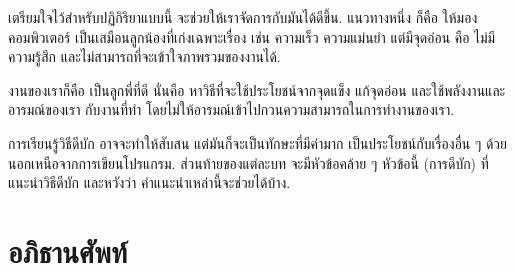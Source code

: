เตรียมใจไว้สำหรับปฏิกิริยาแบบนี้ จะช่วยให้เราจัดการกับมันได้ดีขึ้น.
แนวทางหนึ่ง ก็คือ ให้มองคอมพิวเตอร์ เป็นเสมือนลูกน้องที่เก่งเฉพาะเรื่อง เช่น ความเร็ว ความแม่นยำ
แต่มีจุดอ่อน คือ ไม่มีความรู้สึก และไม่สามารถที่จะเข้าใจภาพรวมของงานได้.

งานของเราก็คือ เป็นลูกพี่ที่ดี
นั่นคือ หาวิธีที่จะใช้ประโยชน์จากจุดแข็ง
แก้จุดอ่อน 
และใช้พลังงานและอารมณ์ของเรา กับงานที่ทำ
โดยไม่ให้อารมณ์เข้าไปกวนความสามารถในการทำงานของเรา.

การเรียนรู้วิธีดีบัก อาจจะทำให้สับสน แต่มันก็จะเป็นทักษะที่มีค่ามาก เป็นประโยชน์กับเรื่องอื่น ๆ ด้วย นอกเหนือจากการเขียนโปรแกรม.
%
ส่วนท้ายของแต่ละบท จะมีหัวข้อคล้าย ๆ หัวข้อนี้ (การดีบัก) ที่แนะนำวิธีดีบัก และหวังว่า คำแนะนำเหล่านี้จะช่วยได้บ้าง.

\section{อภิธานศัพท์}

